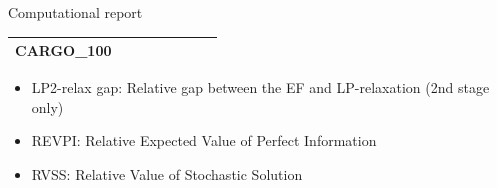 \documentclass{beamer}
\def\eight{\fontsize{8pt}{8pt}\selectfont}
\begin{document}
\begin{frame}{Computational report}
\begin{table}[H]
{\begin{tabular}{|l|ll|ll|l|l|l|}
CARGO\_100                     &                                 &                                &                                  &                                 &                                    &                            &                            \\ \hline	
\end{tabular}%
}
\end{table}
\begin{itemize}
\item LP2-relax gap: Relative gap between the EF and LP-relaxation (2nd stage only)
\item REVPI: Relative Expected Value of Perfect Information
\item RVSS: Relative Value of Stochastic Solution
\end{itemize}
\end{frame}
%
%	
\end{document}
